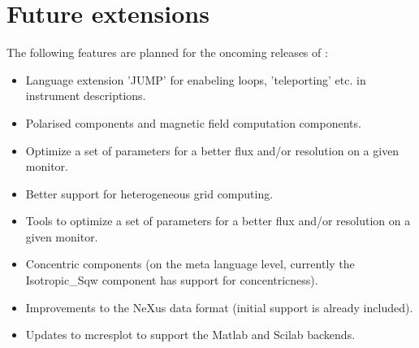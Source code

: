 \section{Future extensions}
\label{s:future}
The following features are planned for the oncoming releases of \MCS :
\begin{itemize}
\item Language extension 'JUMP' for enabeling loops, 'teleporting'
  etc. in instrument descriptions.
\item Polarised components and magnetic field computation components.
\item Optimize a set of parameters for a better flux and/or resolution on a given monitor.
\item Better support for heterogeneous grid computing.
\item Tools to optimize a set of parameters for a better flux and/or
  resolution on a given monitor.
\item Concentric components (on the meta language level, currently the
  Isotropic\_Sqw component has support for concentricness).
\item Improvements to the NeXus data format (initial support is
  already included).
\item Updates to mcresplot to support the Matlab and Scilab backends.
\end{itemize}








